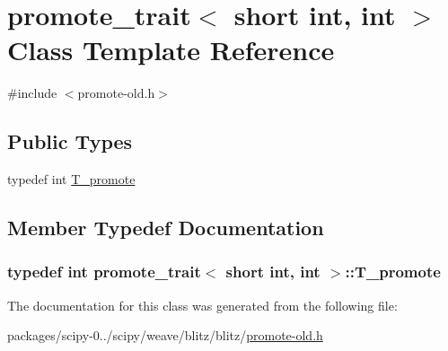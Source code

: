 \hypertarget{classpromote__trait_3_01short_01int_00_01int_01_4}{}\section{promote\+\_\+trait$<$ short int, int $>$ Class Template Reference}
\label{classpromote__trait_3_01short_01int_00_01int_01_4}


{\ttfamily \#include $<$promote-\/old.\+h$>$}

\subsection*{Public Types}
\begin{DoxyCompactItemize}
\item 
typedef int \hyperlink{classpromote__trait_3_01short_01int_00_01int_01_4_a633d21b940838edc5f48b36a19267d4d}{T\+\_\+promote}
\end{DoxyCompactItemize}


\subsection{Member Typedef Documentation}
\hypertarget{classpromote__trait_3_01short_01int_00_01int_01_4_a633d21b940838edc5f48b36a19267d4d}{}
\subsubsection[{T\+\_\+promote}]{\setlength{\rightskip}{0pt plus 5cm}typedef int {\bf promote\+\_\+trait}$<$ short int, int $>$\+::{\bf T\+\_\+promote}}\label{classpromote__trait_3_01short_01int_00_01int_01_4_a633d21b940838edc5f48b36a19267d4d}


The documentation for this class was generated from the following file\+:\begin{DoxyCompactItemize}
\item 
packages/scipy-\/0../scipy/weave/blitz/blitz/\hyperlink{promote-old_8h}{promote-\/old.\+h}\end{DoxyCompactItemize}
